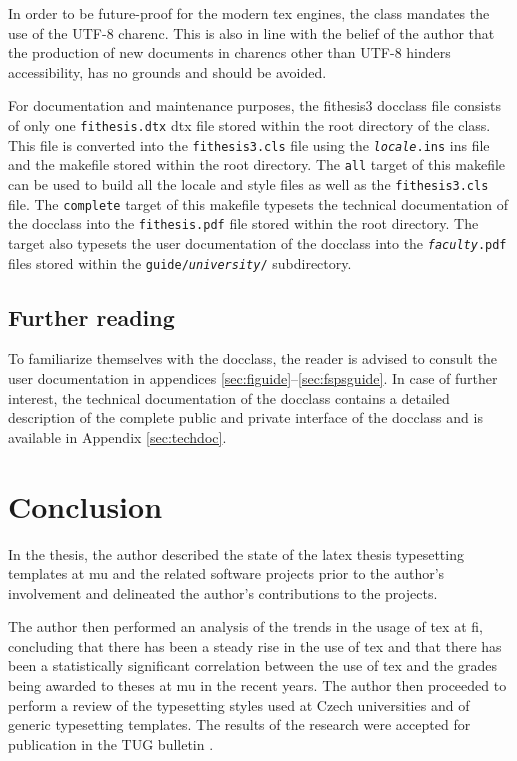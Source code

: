 \documentclass[12pt,twoside,color,table]%
  {fithesis3/fithesis3} %
\begin{document}
  In order to be future-proof for the modern \gls{tex} engines, the
  class mandates the use of the UTF-8 \gls{charenc}. This is also
  in line with the belief of the author that the production of new
  documents in \glspl{charenc} other than UTF-8 hinders
  accessibility, has no grounds and should be avoided.

  For documentation and maintenance purposes, the
  \textsf{fithesis3} \gls{docclass} file consists of only one
  \texttt{fithesis.dtx} \gls{dtx} file stored within the root
  directory of the class. This file is converted into the
  \texttt{fithesis3.cls} file using the
  \texttt{\textit{locale}.ins} \gls{ins} file and the
  \gls{makefile} stored within the root directory. The \texttt{all}
  target of this \gls{makefile} can be used to build all the locale
  and style files as well as the \texttt{fithesis3.cls} file. The
  \texttt{complete} target of this \gls{makefile} typesets the
  technical documentation of the \gls{docclass} \cite{novotny15}
  into the \texttt{fithesis.pdf} file stored within the root
  directory. The target also typesets the user documentation of the
  \gls{docclass} into the \texttt{\textit{faculty}.pdf} files
  stored within the \texttt{guide/\textit{university}/}
  subdirectory.

  \section{Further reading}
  To familiarize themselves with the \gls{docclass}, the reader
  is advised to consult the user documentation in appendices
  \ref{sec:figuide}--\ref{sec:fspsguide}. In case of further
  interest, the technical documentation of the \gls{docclass}
  contains a detailed description of the complete public and
  private interface of the \gls{docclass} and is available in
  Appendix \ref{sec:techdoc}. 

\chapter{Conclusion}
In the thesis, the author described the state of the \gls{latex}
thesis typesetting templates at \gls{mu} and the related software
projects prior to the author's involvement and delineated the
author's contributions to the projects.

The author then performed an analysis of the trends in the usage of
\gls{tex} at \gls{fi}, concluding that there has been a steady rise
in the use of \gls{tex} and that there has been a statistically
significant correlation between the use of \gls{tex} and the grades
being awarded to theses at \gls{mu} in the recent years. The author
then proceeded to perform a review of the typesetting styles used
at Czech universities and of generic typesetting templates. The
results of the research were accepted for publication in the \CS
TUG bulletin \cite{cstug}.
\end{document}
